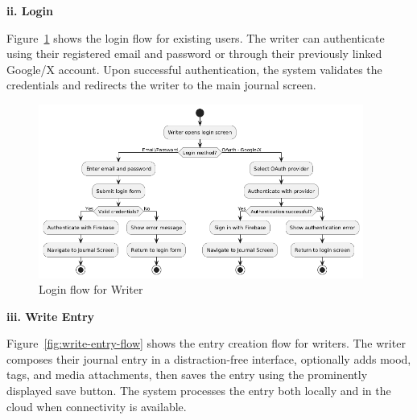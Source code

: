 \textbf{ii. Login}


Figure~\ref{fig:login-flow} shows the login flow for existing users. The writer can authenticate using their registered email and password or through their previously linked Google/X account. Upon successful authentication, the system validates the credentials and redirects the writer to the main journal screen.

\begin{figure}[H]
\centering
\includegraphics[width=0.95\textwidth,height=0.7\textheight,keepaspectratio]{files/imgs/login_flow.png}
\caption{Login flow for Writer}
\label{fig:login-flow}
\end{figure}
\clearpage

\textbf{iii. Write Entry}


Figure~\ref{fig:write-entry-flow} shows the entry creation flow for writers. The writer composes their journal entry in a distraction-free interface, optionally adds mood, tags, and media attachments, then saves the entry using the prominently displayed save button. The system processes the entry both locally and in the cloud when connectivity is available.

